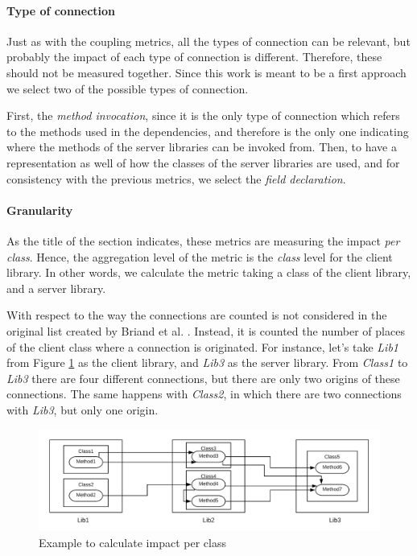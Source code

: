 \paragraph{Type of connection}
Just as with the coupling metrics, all the types of connection can be relevant, but probably the impact of each type of connection is different. Therefore, these should not be measured together. Since this work is meant to be a first approach we select two of the possible types of connection.

First, the \textit{method invocation}, since it is the only type of connection which refers to the methods used in the dependencies, and therefore is the only one indicating where the methods of the server libraries can be invoked from. Then, to have a representation as well of how the classes of the server libraries are used, and for consistency with the previous metrics, we select the \textit{field declaration}.

\paragraph{Granularity}

As the title of the section indicates, these metrics are measuring the impact \textit{per class}. Hence, the aggregation level of the metric is the \textit{class} level for the client library. In other words, we calculate the metric taking a class of the client library, and a server library.

With respect to the way the connections are counted is not considered in the original list created by Briand et al. \cite{briand1999unified}. Instead, it is counted the number of places of the client class where a connection is originated. For instance, let's take \textit{Lib1} from Figure \ref{fig:example-impact-per-class} as the client library, and \textit{Lib3} as the server library. From \textit{Class1} to \textit{Lib3} there are four different connections, but there are only two origins of these connections. The same happens with \textit{Class2}, in which there are two connections with \textit{Lib3}, but only one origin.

\begin{figure}[ht]
\begin{center}
\includegraphics[width=\textwidth]{figures/impact-per-class.png}
\caption{Example to calculate impact per class}
\label{fig:example-impact-per-class}
\end{center}
\end{figure}


